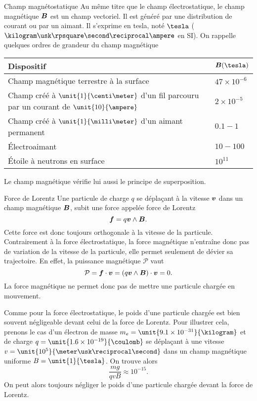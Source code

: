 \begin{defn}{Champ magnétostatique}
	Au même titre que le champ électrostatique, le champ magnétique $\vecb$
	est un champ vectoriel. Il est généré par une distribution de courant ou 
	par un aimant. Il s'exprime en tesla, noté $\tesla$ ($\kilogram \usk
	\rpsquare \second \reciprocal \ampere$ en SI). On rappelle quelques ordres de
	grandeur du champ magnétique
	
	\begin{center}
	\begin{tabular}{l|l}
		\textbf{Dispositif} 	& $\vecb (\tesla)$ \\ \hline
		Champ magnétique terrestre à la surface & $47 \times 10^{-6}$ \\
		Champ créé à $\unit{1}{\centi \meter}$ d'un fil parcouru par 
		un courant de $\unit{10}{\ampere}$
								 & $2 \times 10^{-5}$ \\
		Champ créé à $\unit{1}{\milli \meter}$ d'un aimant permanent& $0.1 - 1$ \\
		Électroaimant & $10 - 100$ \\
		Étoile à neutrons en surface & $10^{11}$\\
	\end{tabular}
	\end{center}
Le champ magnétique vérifie lui aussi le principe de superposition.
\end{defn}

\begin{defn}{Force de Lorentz}
Une particule de charge $q$ se déplaçant à la vitesse $\vecv$ dans un champ magnétique
$\vecb$, subit une force appelée force de Lorentz
\begin{equation}
	\vecf = q\vecv \wedge \vecb.
\end{equation}
Cette force est donc toujours orthogonale à la vitesse de la particule.
Contrairement à la force électrostatique, la force magnétique n'entraîne donc pas 
de variation de la vitesse de la particule, elle permet seulement de dévier sa 
trajectoire. En effet, la puissance magnétique $\mathcal{P}$ vaut
\begin{equation*}
	\mathcal{P} = \vecf \cdot \vecv = (q\vecv \wedge \vecb) \cdot \vecv = 0.
\end{equation*}
La force magnétique ne permet donc pas de mettre une particule chargée en mouvement.
\end{defn}

Comme pour la force électrostatique, le poids d'une particule chargée est bien souvent 
négligeable devant celui de la force de Lorentz. Pour illustrer cela, prenons le 
cas d'un électron de masse $m_e = \unit{9.1 \times 10^{-31}}{\kilogram}$ et de
charge $q = \unit{1.6 \times 10^{-19}}{\coulomb}$ se déplaçant à une vitesse
$v = \unit{10^5}{\meter \usk \reciprocal \second}$ dans un champ magnétique uniforme
$B = \unit{1}{\tesla}$. On trouve alors
\begin{equation*}
	\dfrac{mg}{qvB} \approx 10^{-15}.
\end{equation*}
On peut alors toujours négliger le poids d'une particule chargée
devant la force de Lorentz.

